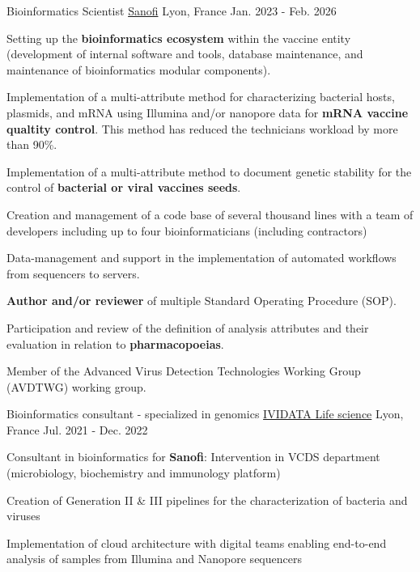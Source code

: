 \begin{cventries}
 \cventry
    {Bioinformatics Scientist} %
    {\href{https://www.sanofi.com/en}{Sanofi}} %
    {Lyon, France} %
    {Jan. 2023 - Feb. 2026} %
    {
      \begin{cvitems} %
        \item {Setting up the \textbf{bioinformatics ecosystem} within the vaccine entity (development of internal software and tools, database maintenance, and maintenance of bioinformatics modular components).}
        \item {Implementation of a multi-attribute method for characterizing bacterial hosts, plasmids, and mRNA using Illumina and/or nanopore data for \textbf{mRNA vaccine qualtity control}. This method has reduced the technicians workload by more than 90\%.}
        \item {Implementation of a multi-attribute method to document genetic stability for the control of \textbf{bacterial or viral vaccines seeds}.}
        \item {Creation and management of a code base of several thousand lines with a team of developers including up to four bioinformaticians (including contractors)}
        \item {Data-management and support in the implementation of automated workflows from sequencers to servers.}
        \item {\textbf{Author and/or reviewer} of multiple Standard Operating Procedure (SOP).}
        \item {Participation and review of the definition of analysis attributes and their evaluation in relation to \textbf{pharmacopoeias}.}
        \item {Member of the Advanced Virus Detection Technologies Working Group (AVDTWG) working group.}
      \end{cvitems}
    }

 \cventry
    {Bioinformatics consultant - specialized in genomics} %
    {\href{https://www.ividata.com/}{IVIDATA Life science}} %
    {Lyon, France} %
    {Jul. 2021 - Dec. 2022} %
    {
      \begin{cvitems} %
        \item {Consultant in bioinformatics for \textcolor[HTML]{7A00E6}{\textbf{Sanofi}}: Intervention in VCDS department (microbiology, biochemistry and immunology platform)}
        \item {Creation of Generation II \& III pipelines for the characterization of bacteria and viruses}
        \item {Implementation of cloud architecture with digital teams enabling end-to-end analysis of samples from Illumina and Nanopore sequencers}
      \end{cvitems}
    }
    

\end{cventries}
